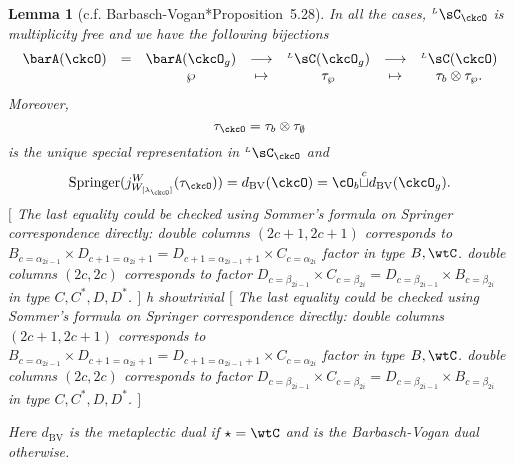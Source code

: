 \documentclass[12pt,a4paper]{amsart}
\newcommand{\trivial}[2][]{\if\relax\detokenize{#1}\relax
  {%
      \color{orange} \vspace{0em} $[$  #2 $]$
      \color{black}
  }
  \else
\ifx#1h
\ifcsname showtrivial\endcsname
{%
    \color{orange} \vspace{0em}  $[$ #2 $]$
    \color{black}
}
\fi
\else {\red Wrong argument!} \fi
\fi
}
\numberwithin{equation}{section}
\newtheorem{lem}[thm]{Lemma}
\theoremstyle{remark}
\def\dBV{d_{\mathrm{BV}}}
\def\WLamck{W_{[\lambda_{\ckcO}]}}
\def\LC{{}^{\scriptscriptstyle L}\sC}
\def\cupcol{{\stackrel{c}{\sqcup}}}
\def\Spr{\mathrm{Springer}}
\def\sP{\wp}
\begin{document}
  \begin{lem}[c.f. Barbasch-Vogan{\cite{BVUni}*{Proposition~5.28}}]
    \label{lem:Lcell}
    In all the cases, $\LC_{\ckcO}$ is multiplicity free and
    we have the following bijections
    \[
      \begin{array}{lccccccc}
        \barA(\ckcO)&=&\barA(\ckcO_{g}) & \longrightarrow & \LC(\ckcO_{g})
        & \longrightarrow & \LC(\ckcO)\\
       &  &\sP & \mapsto & \tau_{\sP} &
         \mapsto & \tau_{b}\otimes \tau_{\sP}.
      \end{array}
    \]
    Moreover,
    \[
      \tau_{\ckcO}=\tau_{b}\otimes \tau_{\emptyset}
    \] is the unique special
    representation in $\LC_{\ckcO}$ and
    \begin{equation}\label{eq:dBV.W}
      \Spr(j_{\WLamck}^{W}(\tau_{\ckcO})) = \dBV(\ckcO) = \cO_{b}\cupcol \dBV(\ckcO_{g}).
    \end{equation}
    \trivial[]{
      The last equality could be checked using Sommer's formula on Springer
      correspondence directly:
      double columns $(2c+1,2c+1)$ corresponds to
      $ B_{c=\alpha_{2i-1}}\times D_{c+1=\alpha_{2i}+1}=D_{c+1=\alpha_{2i-1}+1}\times C_{c=\alpha_{2i}}$ factor in type $B,\wtC$.
      double columns $(2c,2c)$ corresponds to factor
      $D_{c=\beta_{2i-1}}\times C_{c=\beta_{2i}}=D_{c=\beta_{2i-1}}\times B_{c=\beta_{2i}}$
      in type $C,C^{*},D,D^{*}$.
    }
    Here $\dBV$ is the metaplectic dual if $\star=\wtC$ and
    is the Barbasch-Vogan dual otherwise.
  \end{lem}
\end{document}
